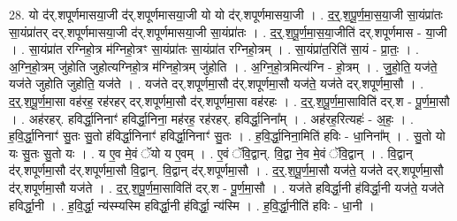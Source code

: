 \documentclass[17pt]{extarticle}
\begin{document}
28. यो द॑र्.शपूर्णमासया॒जी द॑र्.शपूर्णमासया॒जी यो यो द॑र्.शपूर्णमासया॒जी । . द॒र्॒.श॒पू॒र्ण॒मा॒स॒या॒जी सा॒यंप्रा॑तः सा॒यंप्रा॑तर् दर्.शपूर्णमासया॒जी द॑र्.शपूर्णमासया॒जी सा॒यंप्रा॑तः । . द॒र्॒.श॒पू॒र्ण॒मा॒स॒या॒जीति॑ दर्.शपूर्णमास - या॒जी । . सा॒यंप्रा॑त रग्निहो॒त्र म॑ग्निहो॒त्रꣳ सा॒यंप्रा॑तः सा॒यंप्रा॑त रग्निहो॒त्रम् । . सा॒यंप्रा॑त॒रिति॑ सा॒यं - प्रा॒तः॒ । . अ॒ग्नि॒हो॒त्रम् जु॑होति जुहोत्यग्निहो॒त्र म॑ग्निहो॒त्रम् जु॑होति । . अ॒ग्नि॒हो॒त्रमित्य॑ग्नि - हो॒त्रम् । . जु॒हो॒ति॒ यज॑ते॒ यज॑ते जुहोति जुहोति॒ यज॑ते । . यज॑ते दर्.शपूर्णमा॒सौ द॑र्.शपूर्णमा॒सौ यज॑ते॒ यज॑ते दर्.शपूर्णमा॒सौ । . द॒र्॒.श॒पू॒र्ण॒मा॒सा वह॑रह॒ रह॑रहर् दर्.शपूर्णमा॒सौ द॑र्.शपूर्णमा॒सा वह॑रहः । . द॒र्॒.श॒पू॒र्ण॒मा॒साविति॑ दर्.श - पू॒र्ण॒मा॒सौ । . अह॑रहर्. हविर्द्धा॒निनाꣳ॑ हविर्द्धा॒निना॒ मह॑रह॒ रह॑रहर्. हविर्द्धा॒निना᳚म् । . अह॑रह॒रित्यहः॑ - अ॒हः॒ । . ह॒वि॒र्द्धा॒निनाꣳ॑ सु॒तः सु॒तो ह॑विर्द्धा॒निनाꣳ॑ हविर्द्धा॒निनाꣳ॑ सु॒तः । . ह॒वि॒र्द्धा॒निना॒मिति॑ हविः - धा॒निना᳚म् । . सु॒तो यो यः सु॒तः सु॒तो यः । . य ए॒व मे॒वं ॅयो य ए॒वम् । . ए॒वं ॅवि॒द्वान्. वि॒द्वा ने॒व मे॒वं ॅवि॒द्वान् । . वि॒द्वान् द॑र्.शपूर्णमा॒सौ द॑र्.शपूर्णमा॒सौ वि॒द्वान्. वि॒द्वान् द॑र्.शपूर्णमा॒सौ । . द॒र्॒.श॒पू॒र्ण॒मा॒सौ यज॑ते॒ यज॑ते दर्.शपूर्णमा॒सौ द॑र्.शपूर्णमा॒सौ यज॑ते । . द॒र्॒.श॒पू॒र्ण॒मा॒साविति॑ दर्.श - पू॒र्ण॒मा॒सौ । . यज॑ते हविर्द्धा॒नी ह॑विर्द्धा॒नी यज॑ते॒ यज॑ते हविर्द्धा॒नी । . ह॒वि॒र्द्धा॒ न्य॑स्म्यस्मि हविर्द्धा॒नी ह॑विर्द्धा॒ न्य॑स्मि । . ह॒वि॒र्द्धा॒नीति॑ हविः - धा॒नी । \newline
\end{document}
